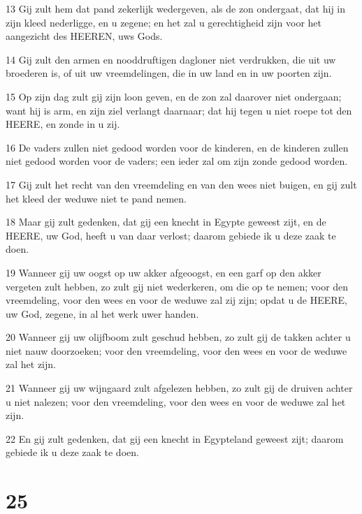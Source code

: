 \par 13 Gij zult hem dat pand zekerlijk wedergeven, als de zon ondergaat, dat hij in zijn kleed nederligge, en u zegene; en het zal u gerechtigheid zijn voor het aangezicht des HEEREN, uws Gods.
\par 14 Gij zult den armen en nooddruftigen dagloner niet verdrukken, die uit uw broederen is, of uit uw vreemdelingen, die in uw land en in uw poorten zijn.
\par 15 Op zijn dag zult gij zijn loon geven, en de zon zal daarover niet ondergaan; want hij is arm, en zijn ziel verlangt daarnaar; dat hij tegen u niet roepe tot den HEERE, en zonde in u zij.
\par 16 De vaders zullen niet gedood worden voor de kinderen, en de kinderen zullen niet gedood worden voor de vaders; een ieder zal om zijn zonde gedood worden.
\par 17 Gij zult het recht van den vreemdeling en van den wees niet buigen, en gij zult het kleed der weduwe niet te pand nemen.
\par 18 Maar gij zult gedenken, dat gij een knecht in Egypte geweest zijt, en de HEERE, uw God, heeft u van daar verlost; daarom gebiede ik u deze zaak te doen.
\par 19 Wanneer gij uw oogst op uw akker afgeoogst, en een garf op den akker vergeten zult hebben, zo zult gij niet wederkeren, om die op te nemen; voor den vreemdeling, voor den wees en voor de weduwe zal zij zijn; opdat u de HEERE, uw God, zegene, in al het werk uwer handen.
\par 20 Wanneer gij uw olijfboom zult geschud hebben, zo zult gij de takken achter u niet nauw doorzoeken; voor den vreemdeling, voor den wees en voor de weduwe zal het zijn.
\par 21 Wanneer gij uw wijngaard zult afgelezen hebben, zo zult gij de druiven achter u niet nalezen; voor den vreemdeling, voor den wees en voor de weduwe zal het zijn.
\par 22 En gij zult gedenken, dat gij een knecht in Egypteland geweest zijt; daarom gebiede ik u deze zaak te doen.

\chapter{25}

